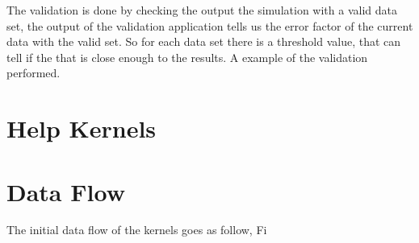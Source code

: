 The validation is done by checking the output the simulation with a valid data set, the output of the validation application tells us the error factor of the current data with the valid set. So for each data set there is a threshold value, that can tell if the that is close enough to the results. A example of the validation performed.


\section{Help Kernels}



\section{Data Flow}


The initial data flow of the kernels goes as follow, Fi
